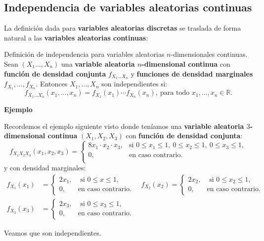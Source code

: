 \documentclass[]{book}
\begin{document}
\hypertarget{independencia-de-variables-aleatorias-continuas-1}{%
\subsection{Independencia de variables aleatorias continuas}\label{independencia-de-variables-aleatorias-continuas-1}}

La definición dada para \textbf{variables aleatorias discretas} se traslada de forma natural a las \textbf{variables aleatorias continuas}:

Definición de independencia para variables aleatorias \(n\)-dimensionales continuas.
Sean \((X_1\ldots,X_n)\) una \textbf{variable aleatoria \(n\)-dimensional continua} con \textbf{función de densidad conjunta} \(f_{X_1\ldots X_n}\) y \textbf{funciones de densidad marginales} \(f_{X_1},\ldots,f_{X_n}\). Entonces \(X_1,\ldots, X_n\) son independientes si:
\[
f_{X_1\ldots X_n}(x_1,\ldots,x_n)=f_{X_1}(x_1)\cdots f_{X_n}(x_n),\ \mbox{para todo $x_1,\ldots,x_n\in\mathbb{R}$.}
\]

\textbf{Ejemplo}

Recordemos el ejemplo siguiente visto donde teníamos una \textbf{variable aleatoria \(3\)-dimensional continua} \((X_1,X_2,X_3)\) con \textbf{función de densidad conjunta}:
\[
f_{X_1X_2X_3}(x_1,x_2,x_3)=\begin{cases}
8 x_1\cdot x_2\cdot x_3, & \mbox{si }0\leq x_1\leq 1,\ 0\leq x_2\leq 1,\ 0\leq x_3\leq 1, \\
0, & \mbox{en caso contrario.}\\
\end{cases}
\]
y con densidad marginales:
\[
\begin{array}{rl}
f_{X_1}(x_1) & =\begin{cases}
2x_1, & \mbox{ si }0\leq x\leq 1,\\
0, & \mbox{en caso contrario.}
\end{cases}\quad f_{X_2}(x_2)=\begin{cases}
2x_2, & \mbox{ si }0\leq x_2\leq 1,\\
0, & \mbox{en caso contrario.}
\end{cases}\\ f_{X_3}(x_3) & =\begin{cases}
2x_3, & \mbox{ si }0\leq x_3\leq 1,\\
0, & \mbox{en caso contrario.}
\end{cases}
\end{array}
\]

Veamos que son independientes.
\end{document}
